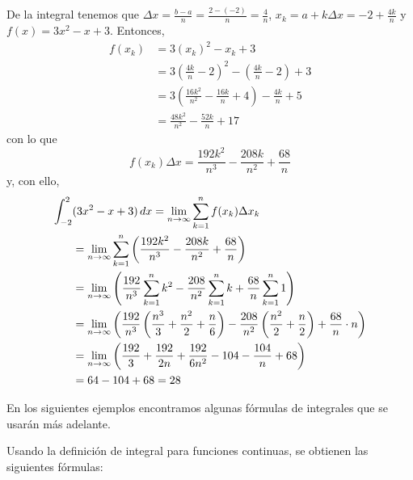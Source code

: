 \begin{parrafonumerado}
De la integral tenemos que $\Delta x=\frac{b-a}{n}=\frac{2-\left( -2\right)}{n}=\frac{4}{n}$, $x_{k}=a+k\Delta x=-2+\frac{4k}{n}$ y $f\left( x\right)=3x^{2}-x+3$. Entonces,
\begin{align*}
f\left( x_{k}\right) &=3\left( x_{k}\right) ^{2}-x_{k}+3 \\
&=3\left( \frac{4k}{n}-2\right) ^{2}-\left( \frac{4k}{n}-2\right) +3 \\
&=3\left( \frac{16k^{2}}{n^{2}}-\frac{16k}{n}+4\right) -\frac{4k}{n}+5 \\
&=\frac{48k^{2}}{n^{2}}-\frac{52k}{n}+17
\end{align*}
con lo que
\[
f(x_{k})\Delta x=\frac{192k^{2}}{n^{3}}-\frac{208k}{n^{2}}+\frac{68}{n}
\]
y, con ello,
\begin{align*}
\int_{-2}^{2}&(3x^{2}-x+3)\,dx=\lim_{n\to\infty}\sum_{k=1}^{n}f(x_{k})\Delta x_{k} \\
&=\lim_{n\to\infty}\sum_{k=1}^{n}
\left( \frac{192k^{2}}{n^{3}}-\frac{208k}{n^{2}}+\frac{68}{n}\right) \\
&=\lim_{n\to\infty}\left( \frac{192}{n^{3}}%
\sum\limits_{k=1}^{n}k^{2}-\frac{208}{n^{2}}\sum\limits_{k=1}^{n}k+\frac{68}{n}\sum\limits_{k=1}^{n}1\right) \\
&=\lim_{n\to\infty}\left( \frac{192}{n^{3}}\left( \frac{%
n^{3}}{3}+\frac{n^{2}}{2}+\frac{n}{6}\right) -\frac{208}{n^{2}}\left( \frac{%
n^{2}}{2}+\frac{n}{2}\right) +\frac{68}{n}\cdot n\right) \\
&=\lim_{n\to\infty}\left( \frac{192}{3}+\frac{192}{2n}+%
\frac{192}{6n^{2}}-104-\frac{104}{n}+68\right) \\
&=64-104+68=28
\end{align*}

\end{parrafonumerado}

En los siguientes ejemplos encontramos algunas fórmulas de integrales que se usarán más adelante.

\begin{ejemplo}
Usando la definición de integral para funciones continuas, se obtienen las siguientes fórmulas:
\end{ejemplo}

